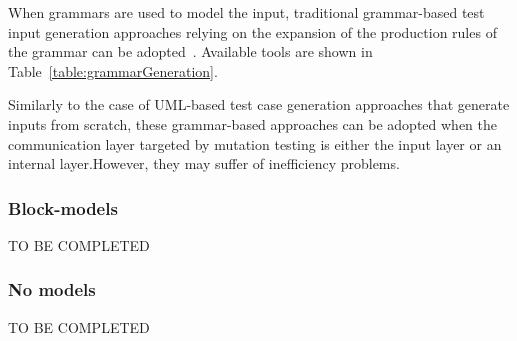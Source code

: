 When grammars are used to model the input, traditional grammar-based test input generation approaches relying on the expansion of the production rules of the grammar can be adopted~\cite{fuzzingbook2019:GrammarFuzzer}. 
Available tools are shown in Table~\ref{table:grammarGeneration}.



Similarly to the case of UML-based test case generation approaches that generate inputs from scratch, these grammar-based approaches can be adopted when the communication layer targeted by mutation testing is either the input layer or an internal layer.However, they may suffer of inefficiency problems.


\subsubsection{Block-models}

TO BE COMPLETED

\subsubsection{No models}

TO BE COMPLETED

\endinput

